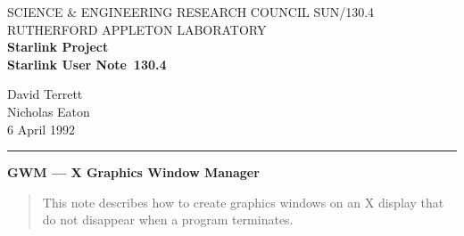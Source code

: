 \pagestyle{myheadings}

\newcommand{\stardoccategory}  {Starlink User Note}
\newcommand{\stardocinitials}  {SUN}
\newcommand{\stardocnumber}    {130.4}
\newcommand{\stardocauthors}   {David Terrett\\Nicholas Eaton}
\newcommand{\stardocdate}      {6 April 1992}
\newcommand{\stardoctitle}     {GWM --- X Graphics Window Manager}

\newcommand{\stardocname}{\stardocinitials /\stardocnumber}
\renewcommand{\_}{{\tt\char'137}}     %
\markright{\stardocname}
\setlength{\textwidth}{160mm}
\setlength{\textheight}{230mm}
\setlength{\topmargin}{-2mm}
\setlength{\oddsidemargin}{0mm}
\setlength{\evensidemargin}{0mm}
\setlength{\parindent}{0mm}
\setlength{\parskip}{\medskipamount}
\setlength{\unitlength}{1mm}



\thispagestyle{empty}
SCIENCE \& ENGINEERING RESEARCH COUNCIL \hfill \stardocname\\
RUTHERFORD APPLETON LABORATORY\\
{\large\bf Starlink Project\\}
{\large\bf \stardoccategory\ \stardocnumber}
\begin{flushright}
\stardocauthors\\
\stardocdate
\end{flushright}
\vspace{-4mm}
\rule{\textwidth}{0.5mm}
\vspace{5mm}
\begin{center}
{\Large\bf \stardoctitle}
\end{center}
\vspace{5mm}


\begin{quote}
This note describes how to create graphics windows on an X display that do not
disappear when a program terminates.
\end{quote}
